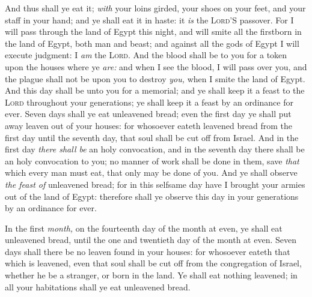 \documentclass[11pt,letterpaper,oneside]{memoir}
\begin{document}
And thus shall ye eat it; \emph{with} your loins girded, your shoes on
your feet, and your staff in your hand; and ye shall eat it in haste: it
\emph{is} the \textsc{Lord}'S passover. For I will pass through the land
of Egypt this night, and will smite all the firstborn in the land of
Egypt, both man and beast; and against all the gods of Egypt I will
execute judgment: I \emph{am} the \textsc{Lord}. And the blood shall be
to you for a token upon the houses where ye \emph{are:} and when I see
the blood, I will pass over you, and the plague shall not be upon you to
destroy \emph{you,} when I smite the land of Egypt. And this day shall
be unto you for a memorial; and ye shall keep it a feast to the
\textsc{Lord} throughout your generations; ye shall keep it a feast by
an ordinance for ever. Seven days shall ye eat unleavened bread; even
the first day ye shall put away leaven out of your houses: for whosoever
eateth leavened bread from the first day until the seventh day, that
soul shall be cut off from Israel. And in the first day \emph{there
shall be} an holy convocation, and in the seventh day there shall be an
holy convocation to you; no manner of work shall be done in them, save
\emph{that} which every man must eat, that only may be done of you. And
ye shall observe \emph{the feast of} unleavened bread; for in this
selfsame day have I brought your armies out of the land of Egypt:
therefore shall ye observe this day in your generations by an ordinance
for ever.

In the first \emph{month,} on the fourteenth day of the month at even,
ye shall eat unleavened bread, until the one and twentieth day of the
month at even. Seven days shall there be no leaven found in your houses:
for whosoever eateth that which is leavened, even that soul shall be cut
off from the congregation of Israel, whether he be a stranger, or born
in the land. Ye shall eat nothing leavened; in all your habitations
shall ye eat unleavened bread.
\end{document}
